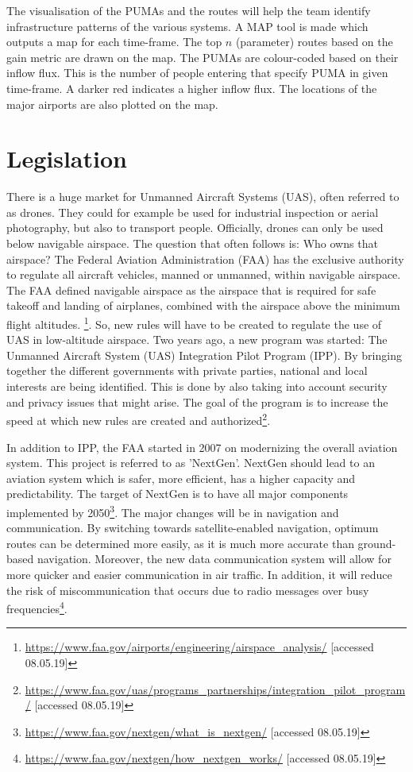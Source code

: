 The visualisation of the PUMAs and the routes will help the team identify infrastructure patterns of the various systems. A MAP tool is made which outputs a map for each time-frame. The top $n$ (parameter) routes based on the gain metric are drawn on the map. The PUMAs are colour-coded based on their inflow flux. This is the number of people entering that specify PUMA in given time-frame. A darker red indicates a higher inflow flux. The locations of the major airports are also plotted on the map. 

\section{Legislation}
\label{legislation}
There is a huge market for Unmanned Aircraft Systems (UAS), often referred to as drones. They could for example be used for industrial inspection or aerial photography, but also to transport people. Officially, drones can only be used below navigable airspace. The question that often follows is: Who owns that airspace? The Federal Aviation Administration (FAA) has the exclusive authority to regulate all aircraft vehicles, manned or unmanned, within navigable airspace. The FAA defined navigable airspace as the airspace that is required for safe takeoff and landing of airplanes, combined with the airspace above the minimum flight altitudes. \footnote{\url{https://www.faa.gov/airports/engineering/airspace_analysis/} [accessed 08.05.19]}. So, new rules will have to be created to regulate the use of UAS in low-altitude airspace. Two years ago, a new program was started: The Unmanned Aircraft System (UAS) Integration Pilot Program (IPP). By bringing together the different governments with private parties, national and local interests are being identified. This is done by also taking into account security and privacy issues that might arise. The goal of the program is to increase the speed at which new rules are created and authorized\footnote{\url{https://www.faa.gov/uas/programs_partnerships/integration_pilot_program/} [accessed 08.05.19]}.

In addition to IPP, the FAA started in 2007 on modernizing the overall aviation system. This project is referred to as 'NextGen'. NextGen should lead to an aviation system which is safer, more efficient, has a higher capacity and predictability. The target of NextGen is to have all major components implemented by 2050\footnote{\url{https://www.faa.gov/nextgen/what_is_nextgen/} [accessed 08.05.19]}. The major changes will be in navigation and communication. By switching towards satellite-enabled navigation, optimum routes can be determined more easily, as it is much more accurate than ground-based navigation. Moreover, the new data communication system will allow for more quicker and easier communication in air traffic. In addition, it will reduce the risk of miscommunication that occurs due to radio messages over busy frequencies\footnote{\url{https://www.faa.gov/nextgen/how_nextgen_works/} [accessed 08.05.19]}.

